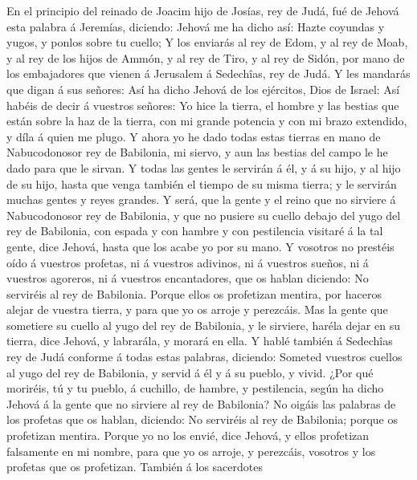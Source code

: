  En el principio del reinado de Joacim hijo de Josías, rey
de Judá, fué de Jehová esta palabra á Jeremías, diciendo: 
Jehová me ha dicho así: Hazte coyundas y yugos, y ponlos sobre tu
cuello;  Y los enviarás al rey de Edom, y al rey de Moab,
y al rey de los hijos de Ammón, y al rey de Tiro, y al rey de Sidón, por
mano de los embajadores que vienen á Jerusalem á Sedechîas, rey de Judá.
 Y les mandarás que digan á sus señores: Así ha dicho
Jehová de los ejércitos, Dios de Israel: Así habéis de decir á vuestros
señores:  Yo hice la tierra, el hombre y las bestias que
están sobre la haz de la tierra, con mi grande potencia y con mi brazo
extendido, y díla á quien me plugo.  Y ahora yo he dado
todas estas tierras en mano de Nabucodonosor rey de Babilonia, mi
siervo, y aun las bestias del campo le he dado para que le sirvan.
 Y todas las gentes le servirán á él, y á su hijo, y al
hijo de su hijo, hasta que venga también el tiempo de su misma tierra; y
le servirán muchas gentes y reyes grandes.  Y será, que la
gente y el reino que no sirviere á Nabucodonosor rey de Babilonia, y que
no pusiere su cuello debajo del yugo del rey de Babilonia, con espada y
con hambre y con pestilencia visitaré á la tal gente, dice Jehová, hasta
que los acabe yo por su mano.  Y vosotros no prestéis oído
á vuestros profetas, ni á vuestros adivinos, ni á vuestros sueños, ni á
vuestros agoreros, ni á vuestros encantadores, que os hablan diciendo:
No serviréis al rey de Babilonia.  Porque ellos os
profetizan mentira, por haceros alejar de vuestra tierra, y para que yo
os arroje y perezcáis.  Mas la gente que sometiere su
cuello al yugo del rey de Babilonia, y le sirviere, haréla dejar en su
tierra, dice Jehová, y labrarála, y morará en ella.  Y
hablé también á Sedechîas rey de Judá conforme á todas estas palabras,
diciendo: Someted vuestros cuellos al yugo del rey de Babilonia, y
servid á él y á su pueblo, y vivid.  ¿Por qué moriréis,
tú y tu pueblo, á cuchillo, de hambre, y pestilencia, según ha dicho
Jehová á la gente que no sirviere al rey de Babilonia? 
No oigáis las palabras de los profetas que os hablan, diciendo: No
serviréis al rey de Babilonia; porque os profetizan mentira.
 Porque yo no los envié, dice Jehová, y ellos profetizan
falsamente en mi nombre, para que yo os arroje, y perezcáis, vosotros y
los profetas que os profetizan.  También á los sacerdotes
